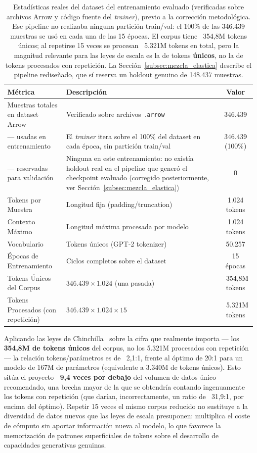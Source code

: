 \begin{table}[H]
\centering
\begin{tabularx}{\textwidth}{|l|X|c|}
\hline
\textbf{Métrica} & \textbf{Descripción} & \textbf{Valor} \\ \hline
Muestras totales en dataset Arrow & Verificado sobre archivos \texttt{.arrow} & 346.439 \\ \hline
\quad — usadas en entrenamiento & El \textit{trainer} itera sobre el 100\% del dataset en cada época, sin partición train/val & 346.439 (100\%) \\ \hline
\quad — reservadas para validación & Ninguna en este entrenamiento: no existía holdout real en el pipeline que generó el checkpoint evaluado (corregido posteriormente, ver Sección~\ref{subsec:mezcla_elastica}) & 0 \\ \hline
Tokens por Muestra & Longitud fija (padding/truncation) & 1.024 tokens \\ \hline
Contexto Máximo & Longitud máxima procesada por modelo & 1.024 tokens \\ \hline
Vocabulario & Tokens únicos (GPT-2 tokenizer) & 50.257 \\ \hline
Épocas de Entrenamiento & Ciclos completos sobre el dataset & 15 épocas \\ \hline
Tokens Únicos del Corpus & $346.439 \times 1.024$ (una pasada) & ~354,8M tokens \\ \hline
Tokens Procesados (con repetición) & $346.439 \times 1.024 \times 15$ & ~5.321M tokens \\ \hline
\end{tabularx}
\caption{Estadísticas reales del dataset del entrenamiento evaluado (verificadas sobre archivos Arrow y código fuente del \textit{trainer}), previo a la corrección metodológica. Ese pipeline no realizaba ninguna partición train/val: el 100\% de las 346.439 muestras se usó en cada una de las 15 épocas. El corpus tiene ~354,8M tokens únicos; al repetirse 15 veces se procesan ~5.321M tokens en total, pero la magnitud relevante para las leyes de escala es la de tokens \textbf{únicos}, no la de tokens procesados con repetición. La Sección~\ref{subsec:mezcla_elastica} describe el pipeline rediseñado, que sí reserva un holdout genuino de 148.437 muestras.}
\end{table}

Aplicando las leyes de Chinchilla~\cite{hoffmann2022chinchilla} sobre la cifra que realmente importa --- los \textbf{354,8M de tokens únicos} del corpus, no los 5.321M procesados con repetición --- la relación tokens/parámetros es de ~2,1:1, frente al óptimo de 20:1 para un modelo de 167M de parámetros (equivalente a 3.340M de tokens únicos). Esto sitúa el proyecto \textbf{~9,4 veces por debajo} del volumen de datos único recomendado, una brecha mayor de la que se obtendría contando ingenuamente los tokens con repetición (que darían, incorrectamente, un ratio de ~31,9:1, por encima del óptimo). Repetir 15 veces el mismo corpus reducido no sustituye a la diversidad de datos nuevos que las leyes de escala presuponen: multiplica el coste de cómputo sin aportar información nueva al modelo, lo que favorece la memorización de patrones superficiales de tokens sobre el desarrollo de capacidades generativas genuinas.

